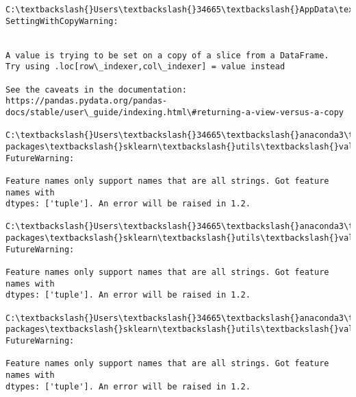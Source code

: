 \documentclass[11pt]{article}
\begin{document}
    \begin{Verbatim}[commandchars=\\\{\}]
C:\textbackslash{}Users\textbackslash{}34665\textbackslash{}AppData\textbackslash{}Local\textbackslash{}Temp\textbackslash{}ipykernel\_25508\textbackslash{}3231398334.py:24:
SettingWithCopyWarning:


A value is trying to be set on a copy of a slice from a DataFrame.
Try using .loc[row\_indexer,col\_indexer] = value instead

See the caveats in the documentation: https://pandas.pydata.org/pandas-
docs/stable/user\_guide/indexing.html\#returning-a-view-versus-a-copy

C:\textbackslash{}Users\textbackslash{}34665\textbackslash{}anaconda3\textbackslash{}lib\textbackslash{}site-packages\textbackslash{}sklearn\textbackslash{}utils\textbackslash{}validation.py:1688:
FutureWarning:

Feature names only support names that are all strings. Got feature names with
dtypes: ['tuple']. An error will be raised in 1.2.

C:\textbackslash{}Users\textbackslash{}34665\textbackslash{}anaconda3\textbackslash{}lib\textbackslash{}site-packages\textbackslash{}sklearn\textbackslash{}utils\textbackslash{}validation.py:1688:
FutureWarning:

Feature names only support names that are all strings. Got feature names with
dtypes: ['tuple']. An error will be raised in 1.2.

C:\textbackslash{}Users\textbackslash{}34665\textbackslash{}anaconda3\textbackslash{}lib\textbackslash{}site-packages\textbackslash{}sklearn\textbackslash{}utils\textbackslash{}validation.py:1688:
FutureWarning:

Feature names only support names that are all strings. Got feature names with
dtypes: ['tuple']. An error will be raised in 1.2.

    \end{Verbatim}
\end{document}
